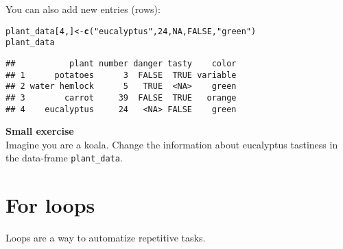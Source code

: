 \documentclass[12pt,a4paper]{scrartcl}\usepackage[]{graphicx}\usepackage[]{color}
\makeatletter
\newcommand{\hlnum}[1]{\textcolor[rgb]{0.686,0.059,0.569}{#1}}%
\newcommand{\hlstr}[1]{\textcolor[rgb]{0.192,0.494,0.8}{#1}}%
\newcommand{\hlstd}[1]{\textcolor[rgb]{0.345,0.345,0.345}{#1}}%
\newcommand{\hlkwb}[1]{\textcolor[rgb]{0.69,0.353,0.396}{#1}}%
\newcommand{\hlkwd}[1]{\textcolor[rgb]{0.737,0.353,0.396}{\textbf{#1}}}%
\newenvironment{kframe}{%
 \def\at@end@of@kframe{}%
 \ifinner\ifhmode%
  \def\at@end@of@kframe{\end{minipage}}%
  \begin{minipage}{\columnwidth}%
 \fi\fi%
 \def\FrameCommand##1{\hskip\@totalleftmargin \hskip-\fboxsep
 \colorbox{shadecolor}{##1}\hskip-\fboxsep
     \hskip-\linewidth \hskip-\@totalleftmargin \hskip\columnwidth}%
 \MakeFramed {\advance\hsize-\width
   \@totalleftmargin\z@ \linewidth\hsize
   \@setminipage}}%
 {\par\unskip\endMakeFramed%
 \at@end@of@kframe}
\newenvironment{knitrout}{}{} %
\makeatother
\begin{document}
You can also add new entries (rows):
\begin{knitrout}
\color{fgcolor}\begin{kframe}
\begin{alltt}
\hlstd{plant_data[}\hlnum{4}\hlstd{,]} \hlkwb{<-} \hlkwd{c}\hlstd{(}\hlstr{"eucalyptus"}\hlstd{,} \hlnum{24}\hlstd{,} \hlnum{NA}\hlstd{,} \hlnum{FALSE}\hlstd{,} \hlstr{"green"}\hlstd{)}
\hlstd{plant_data}
\end{alltt}
\begin{verbatim}
##           plant number danger tasty    color
## 1      potatoes      3  FALSE  TRUE variable
## 2 water hemlock      5   TRUE  <NA>    green
## 3        carrot     39  FALSE  TRUE   orange
## 4    eucalyptus     24   <NA> FALSE    green
\end{verbatim}
\end{kframe}
\end{knitrout}


\begin{mdframed}
\textbf{Small exercise}\\
Imagine you are a koala. Change the information about eucalyptus tastiness in the data-frame \verb+plant_data+.

\end{mdframed}

\section{For loops}
Loops are a way to automatize repetitive tasks. 
\end{document}
